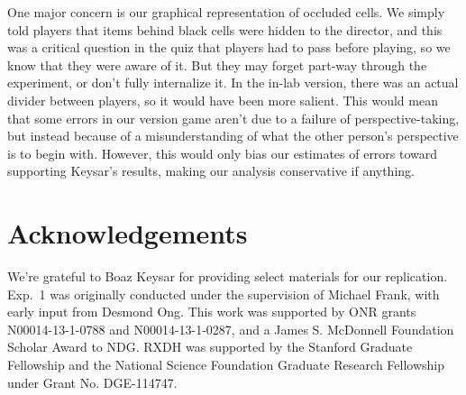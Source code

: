 \documentclass[10pt,letterpaper]{article}
\begin{document}

One major concern is our graphical representation of occluded cells. We simply told players that items behind black cells were hidden to the director, and this was a critical question in the quiz that players had to pass before playing, so we know that they were aware of it. But they may forget part-way through the experiment, or don't fully internalize it. In the in-lab version, there was an actual divider between players, so it would have been more salient. This would mean that some errors in our version game aren't due to a failure of perspective-taking, but instead because of a misunderstanding of what the other person's perspective is to begin with. However, this would only bias our estimates of errors toward supporting Keysar's results, making our analysis conservative if anything. 


\section{Acknowledgements}

\small We're grateful to Boaz Keysar for providing select materials for our replication. Exp.~1 was originally conducted under the supervision of Michael Frank, with early input from Desmond Ong. This work was supported by ONR grants N00014-13-1-0788 and N00014-13-1-0287,  and a James S. McDonnell Foundation Scholar Award to NDG. RXDH was supported by the Stanford Graduate Fellowship and the National Science Foundation Graduate Research Fellowship under Grant No. DGE-114747. 



\setlength{\bibleftmargin}{.125in}
\setlength{\bibindent}{-\bibleftmargin}


\end{document}
